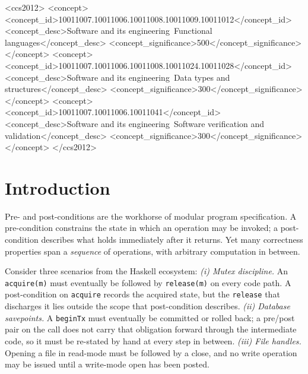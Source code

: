 \documentclass[acmsmall,screen]{acmart}
\begin{document}

\begin{CCSXML}
<ccs2012>
  <concept>
    <concept_id>10011007.10011006.10011008.10011009.10011012</concept_id>
    <concept_desc>Software and its engineering~Functional languages</concept_desc>
    <concept_significance>500</concept_significance>
  </concept>
  <concept>
    <concept_id>10011007.10011006.10011008.10011024.10011028</concept_id>
    <concept_desc>Software and its engineering~Data types and structures</concept_desc>
    <concept_significance>300</concept_significance>
  </concept>
  <concept>
    <concept_id>10011007.10011006.10011041</concept_id>
    <concept_desc>Software and its engineering~Software verification and validation</concept_desc>
    <concept_significance>300</concept_significance>
  </concept>
</ccs2012>
\end{CCSXML}

\maketitle

\section{Introduction}
\label{sec:intro}

Pre- and post-conditions are the workhorse of modular program specification.
A pre-condition constrains the state in which an operation may be invoked;
a post-condition describes what holds immediately after it returns.
Yet many correctness properties span a \emph{sequence} of operations, with
arbitrary computation in between.

Consider three scenarios from the Haskell ecosystem:
\emph{(i) Mutex discipline.}
An \lstinline{acquire(m)} must eventually be followed by
\lstinline{release(m)} on every code path.
A post-condition on \lstinline{acquire} records the acquired state, but the
\lstinline{release} that discharges it lies outside the scope that
post-condition describes.
\emph{(ii) Database savepoints.}
A \lstinline{beginTx} must eventually be committed or rolled back; a
pre/post pair on the call does not carry that obligation forward through the
intermediate code, so it must be re-stated by hand at every step in between.
\emph{(iii) File handles.}
Opening a file in read-mode must be followed by a close, and no write
operation may be issued until a write-mode open has been posted.
\end{document}

